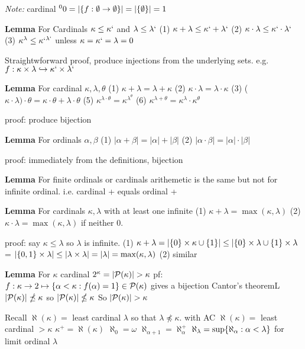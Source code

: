 \emph{Note: } cardinal $\leftsuperscript{0}{0} = | \set{f : \emptyset \rightarrow \emptyset}| = |\set{\emptyset}| = 1$

\textbf{Lemma}
For Cardinals $\kappa \leq \kappa`$ and $\lambda \leq \lambda`$
(1) $\kappa + \lambda \leq \kappa` + \lambda`$
(2) $\kappa \cdot \lambda \leq \kappa` \cdot \lambda`$
(3) $\kappa^\lambda \leq \kappa`^{\lambda`}$ unless $\kappa = \kappa` = \lambda = 0$


    Straightwforward proof, produce injections from the underlying sets.
    e.g. $f : \kappa \times \lambda \hookrightarrow \kappa` \times \lambda`$

\textbf{Lemma}
For cardinal $\kappa, \lambda, \theta$
(1) $\kappa + \lambda = \lambda + \kappa$
(2) $\kappa \cdot \lambda = \lambda \cdot \kappa$
(3) ($\kappa \cdot \lambda) \cdot \theta = \kappa \cdot \theta + \lambda \cdot \theta$
(5) $\kappa^{\lambda \cdot \theta} = \kappa^{\lambda^\theta}$
(6) $\kappa^{\lambda + \theta} = \kappa^\lambda \cdot \kappa^\theta$

proof: produce bijection

\textbf{Lemma}
For ordinals $\alpha, \beta$
(1) $|\alpha + \beta| = |\alpha| + |\beta|$
(2) $|\alpha \cdot \beta| = |\alpha| \cdot |\beta|$

proof: immediately from the definitions, bijection

\textbf{Lemma}
For finite ordinals or cardinals
arithemetic is the same but not for infinite ordinal. i.e. cardinal + equals ordinal +

\textbf{Lemma}
For cardinals $\kappa, \lambda$ with at least one infinite
(1) $\kappa + \lambda = \max(\kappa,\lambda)$
(2) $\kappa \cdot \lambda = \max(\kappa,\lambda)$ if neither 0.

proof: say $\kappa \leq \lambda$ so $\lambda$ is infinite.
(1) $\kappa + \lambda = |\set{0} \times \kappa \cup \set{1} \time \lambda | \leq |\set{0}\times\lambda \cup \set{1} \times \lambda$ = $|\{0,1\}\times \lambda| \leq |\lambda \times \lambda| = |\lambda| = \max(\kappa,\lambda)$
(2) similar

\textbf{Lemma}
For $\kappa$ cardinal
$2^\kappa = |\mathcal{P}(\kappa)| > \kappa$
pf: $f : \kappa \rightarrow 2 \mapsto \{\alpha < \kappa : f(\alpha) = 1\} \in \mathcal{P}(\kappa)$ gives a bijection
Cantor's theoremL $|\mathcal{P}(\kappa)| \npreceq \kappa$ so $|\mathcal{P}(\kappa)| \nleq \kappa$
So $|\mathcal{P}(\kappa)| > \kappa$

Recall $\aleph(\kappa) =$ least cardinal $\lambda$ so that $\lambda \npreceq \kappa$.
with AC $\aleph(\kappa) = $ least cardinal $> \kappa$
$\kappa^+ = \aleph(\kappa)$
$\aleph_0 = \omega$
$\aleph_{\alpha + 1} = \aleph_\alpha^+$
$\aleph_\lambda = \sup\{\aleph_\alpha : \alpha < \lambda\}$ for limit ordinal $\lambda$

